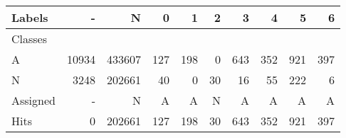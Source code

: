 \begin{tabular}{l|r|r|r|r|r|r|r|r|r}

Labels &      - &       N &    0 &    1 &   2 &    3 &    4 &    5 &    6 \\\hline
Classes  &        &         &      &      &     &      &      &      &      \\\hline
\hline
A        &  10934 &  433607 &  127 &  198 &   0 &  643 &  352 &  921 &  397 \\\hline
N        &   3248 &  202661 &   40 &    0 &  30 &   16 &   55 &  222 &    6 \\\hline
\hline
Assigned &      - &       N &    A &    A &   N &    A &    A &    A &    A \\\hline
Hits     &      0 &  202661 &  127 &  198 &  30 &  643 &  352 &  921 &  397 
\end{tabular}
